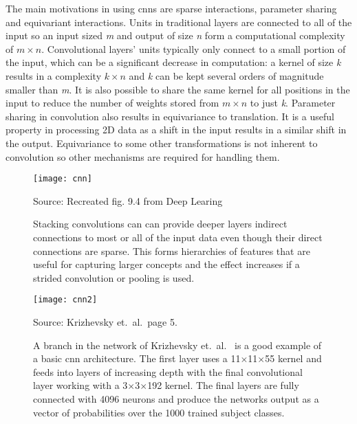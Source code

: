 The main motivations in using \ac{cnn}s are sparse interactions, parameter sharing
and equivariant interactions. Units in traditional layers are connected to all of the
input so an input sized \textit{m} and output of size \textit{n} form a computational
complexity of $m \times n$. Convolutional layers' units typically only connect to a small
portion of the input, which can be a significant decrease in computation: a kernel of
size \textit{k} results in a complexity $k \times n$ and \textit{k} can be kept several
orders of magnitude smaller than \textit{m}. It is also possible to share the same kernel
for all positions in the input to reduce the number of weights stored from $m \times n$
to just \textit{k}. Parameter sharing in convolution also results in equivariance to
translation. It is a useful property in processing 2D data as a shift in the input
results in a similar shift in the output. Equivariance to some other transformations is not
inherent to convolution so other mechanisms are required for handling them.

\begin{figure}[H]
\centering
\texttt{[image: cnn]}
\caption*{Source: Recreated fig. 9.4 from Deep Learing~\cite{DEEP_LEARNING}}
\caption{Stacking convolutions can can provide deeper layers indirect connections to
         most or all of the input data even though their direct connections are sparse.
         This forms hierarchies of features that are useful for capturing larger concepts
         and the effect increases if a strided convolution or pooling is used.~\cite{DEEP_LEARNING}}\label{fig:scon}
\end{figure}

\begin{figure}[H]
\centering
\texttt{[image: cnn2]}
\caption*{Source: Krizhevsky et.~al.~page 5.~\cite{NIPS_IMAGENET}}
\caption{A branch in the network of Krizhevsky et.~al.~\cite{NIPS_IMAGENET} is a good example
         of a basic \ac{cnn} architecture. The first layer uses a 11$\times$11$\times$55 kernel
         and feeds into layers of increasing depth with the final convolutional layer working
         with a 3$\times$3$\times$192 kernel. The final layers are fully connected with 4096
         neurons and produce the networks output as a vector of probabilities over the 1000
         trained subject classes.}\label{fig:cnn}
\end{figure}

